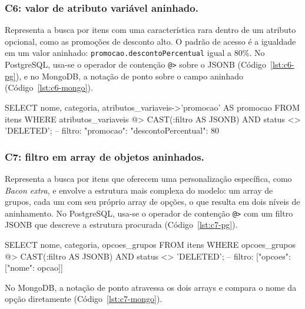 \subsubsection{C6: valor de atributo variável aninhado.} Representa a busca por itens com 
uma característica rara dentro de um atributo opcional, como as promoções de desconto alto. 
O padrão de acesso é a igualdade em um valor aninhado:  
\texttt{promocao.descontoPercentual} igual a 80\%. 
No PostgreSQL, usa-se o operador de contenção \texttt{@>} sobre o JSONB 
(Código~\ref{lst:c6-pg}), e no MongoDB, a notação de ponto sobre o campo aninhado 
(Código~\ref{lst:c6-mongo}). 

\begin{codigo}[language=SQL, breaklines=true, caption={C6 no PostgreSQL.}, label={lst:c6-pg}]
SELECT nome, categoria, atributos_variaveis->'promocao' AS promocao
FROM itens
WHERE atributos_variaveis @> CAST(:filtro AS JSONB)
  AND status <> 'DELETED';
-- filtro: {"promocao": {"descontoPercentual": 80}}
\end{codigo}



\subsubsection{C7: filtro em array de objetos aninhados.} Representa a busca por itens que oferecem uma personalização específica, como \textit{Bacon extra}, e envolve a estrutura mais complexa do modelo: um array de grupos, cada um com seu próprio array de opções, o que resulta em dois níveis de aninhamento. No PostgreSQL, usa-se o operador de contenção \texttt{@>} com um filtro JSONB que descreve a estrutura procurada (Código~\ref{lst:c7-pg}). 

\begin{codigo}[language=SQL, breaklines=true, caption={C7 no PostgreSQL.}, label={lst:c7-pg}]
SELECT nome, categoria, opcoes_grupos
FROM itens
WHERE opcoes_grupos @> CAST(:filtro AS JSONB) AND status <> 'DELETED';
-- filtro: [{"opcoes": [{"nome": opcao}]}]
\end{codigo}

No MongoDB, a notação de ponto atravessa os dois arrays e compara o nome da opção diretamente (Código~\ref{lst:c7-mongo}).


